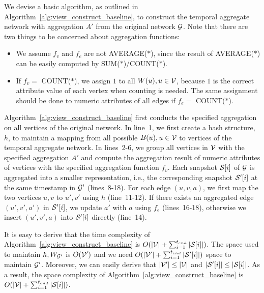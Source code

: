 \documentclass[10pt,journal,compsoc]{IEEEtran}
\begin{document}
We devise a basic algorithm, as outlined in Algorithm~\ref{alg:view_construct_baseline},  to construct the temporal aggregate network with aggregation $ A' $ from the original network $ \mathcal{G} $. Note that there are two things to be concerned about aggregation functions:
\begin{itemize}[leftmargin=*]
	\item We assume $ f_v $ and $ f_e $ are not AVERAGE($\ast$), since the result of AVERAGE($\ast$) can be easily computed by SUM($\ast$)/COUNT($\ast$).
	
	\item If $ f_v =$ COUNT($\ast$), we assign $1$ to all $ W(u),u \in \mathcal{V} $, because $ 1 $ is the correct attribute value of each vertex when counting is needed. The same assignment should be done to numeric attributes of all edges if $ f_e= $ COUNT($\ast$).
\end{itemize}
Algorithm~\ref{alg:view_construct_baseline} first conducts the specified aggregation on all vertices of the original network. In line~1, we first create a hash structure, $h$, to maintain a mapping from all possible $ B(u),u \in \mathcal{V} $ to vertices of the temporal aggregate network. In lines~2-6, we group all vertices in $ \mathcal{V} $ with the specified aggregation $ A' $ and compute the aggregation result of numeric attributes of vertices with the specified aggregation function $ f_v $. Each snapshot $ \mathcal{S}[i] $ of $ \mathcal{G} $ is aggregated into a smaller representation, i.e., the corresponding snapshot $ \mathcal{S}'[i] $ at the same timestamp in $ \mathcal{G}' $ (lines~8-18). For each edge $ (u,v,a) $, we first map the two vertices $ u,v $ to $ u',v' $ using $ h $ (line~11-12). If there exists an aggregated edge $ (u',v',a') $ in $ \mathcal{S}'[i] $, we update $ a' $ with $ a $ using $ f_e $ (lines~16-18), otherwise we insert $ (u',v',a) $ into $ \mathcal{S}'[i] $ directly (line~14).

It is easy to derive that the time complexity of Algorithm~\ref{alg:view_construct_baseline} is $ O(|\mathcal{V}|+\sum_{i=1}^{t_{end}}{|\mathcal{S}[i]|}) $. The space used to maintain $ h,W_{\mathcal{G}'} $ is $ O(\mathcal{V}') $ and we need $ O(|\mathcal{V}'|+\sum_{i=1}^{t_{end}}{|\mathcal{S}'[i]|}) $ space to maintain $ \mathcal{G}' $. Moreover, we can easily derive that $ |\mathcal{V}'| \leq |\mathcal{V}| $ and $ |\mathcal{S}'[i]| \leq |\mathcal{S}[i]| $. As a result, the space complexity of Algorithm~\ref{alg:view_construct_baseline} is $ O(|\mathcal{V}|+\sum_{i=1}^{t_{end}}{|\mathcal{S}[i]|}) $.

\end{document}
